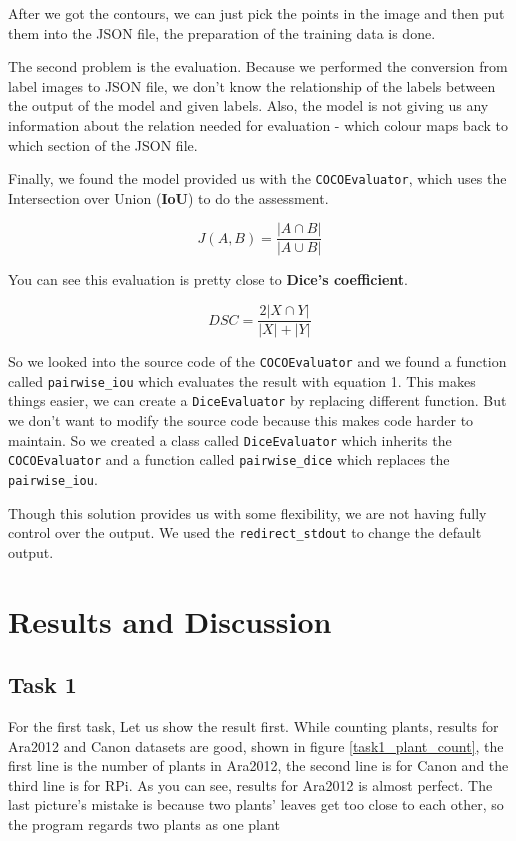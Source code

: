 \documentclass[conference]{IEEEtran}
\begin{document}
After we got the contours, we can just pick the points in the image and then put them into the JSON file, the preparation of the training data is done.

The second problem is the evaluation. Because we performed the conversion from label images to JSON file, we don't know the relationship of the labels between the output of the model and given labels. Also, the model is not giving us any information about the relation needed for evaluation - which colour maps back to which section of the JSON file. 

Finally, we found the model provided us with the \verb|COCOEvaluator|, which uses the Intersection over Union (\textbf{IoU}) to do the assessment. 

\begin{equation}
    J(A,B)=\frac{|A\cap B|}{|A\cup B|}
    \label{eq:IoU}
\end{equation}

You can see this evaluation is pretty close to \textbf{Dice's coefficient}. 

\begin{equation}
	DSC = \frac{2|X \cap Y|}{|X| + |Y|}
	\label{eq:Dice}
\end{equation}

So we looked into the source code of the \verb|COCOEvaluator| and we found a function called \verb|pairwise_iou| which evaluates the result with equation 1. This makes things easier, we can create a \verb|DiceEvaluator| by replacing different function. But we don't want to modify the source code because this makes code harder to maintain. So we created a class called \verb|DiceEvaluator| which inherits the \verb|COCOEvaluator| and a function called \verb|pairwise_dice| which replaces the \verb|pairwise_iou|. 

Though this solution provides us with some flexibility, we are not having fully control over the output. We used the \verb|redirect_stdout| to change the default output. 


\section{Results and Discussion}

\subsection{Task 1}
For the first task, Let us show the result first. While counting plants, results for Ara2012 and Canon datasets are good, shown in figure \ref{task1_plant_count}, the first line is the number of plants in Ara2012, the second line is for Canon and the third line is for RPi. As you can see, results for Ara2012 is almost perfect. The last picture’s mistake is because two plants’ leaves get too close to each other, so the program regards two plants as one plant
\end{document}
